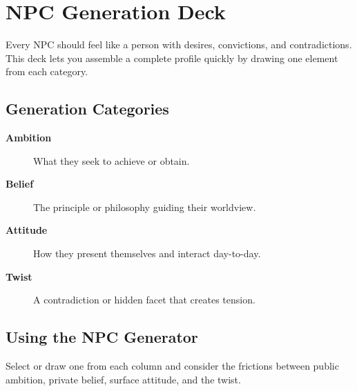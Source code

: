 \section{NPC Generation Deck}\label{sec:npc_generation}

Every NPC should feel like a person with desires, convictions, and contradictions. This deck lets you assemble a complete profile quickly by drawing one element from each category.

\subsection{Generation Categories}\label{subsec:npc_categories}

\begin{description}
    \item[\textbf{Ambition}] What they seek to achieve or obtain. 
    \item[\textbf{Belief}] The principle or philosophy guiding their worldview. 
    \item[\textbf{Attitude}] How they present themselves and interact day-to-day. 
    \item[\textbf{Twist}] A contradiction or hidden facet that creates tension. 
\end{description}

\subsection{Using the NPC Generator}\label{subsec:npc_usage}
Select or draw one from each column and consider the frictions between public ambition, private belief, surface attitude, and the twist.

